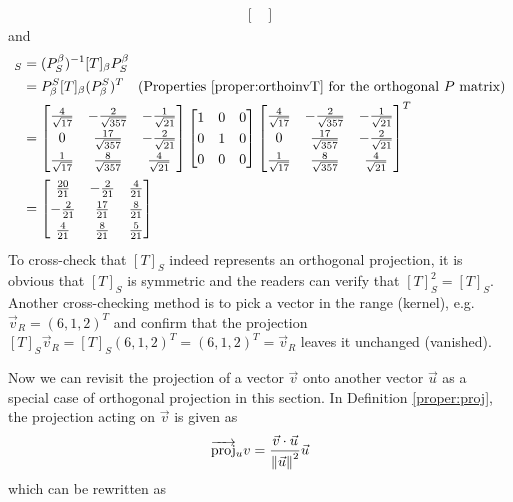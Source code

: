 \begin{solution}
\begin{align*}
\begin{bmatrix}
\end{bmatrix}
\end{align*}
and
\begin{align*}
[T]_S &= (P_S^\beta)^{-1} [T]_\beta P_S^\beta \\
&= P_\beta^S [T]_\beta (P_\beta^S)^T \text{\quad (Properties \ref{proper:orthoinvT} for the orthogonal $P$ matrix)} \\
&=
\renewcommand\arraystretch{1.25}
\begin{bmatrix}
\frac{4}{\sqrt{17}} & -\frac{2}{\sqrt{357}} & -\frac{1}{\sqrt{21}} \\
0 & \frac{17}{\sqrt{357}} & -\frac{2}{\sqrt{21}} \\
\frac{1}{\sqrt{17}} & \frac{8}{\sqrt{357}} & \frac{4}{\sqrt{21}}
\end{bmatrix}
\begin{bmatrix}
1 & 0 & 0 \\
0 & 1 & 0 \\
0 & 0 & 0
\end{bmatrix}
\begin{bmatrix}
\frac{4}{\sqrt{17}} & -\frac{2}{\sqrt{357}} & -\frac{1}{\sqrt{21}} \\
0 & \frac{17}{\sqrt{357}} & -\frac{2}{\sqrt{21}} \\
\frac{1}{\sqrt{17}} & \frac{8}{\sqrt{357}} & \frac{4}{\sqrt{21}}
\end{bmatrix}^T \\
&=
\renewcommand\arraystretch{1.25}
\begin{bmatrix}
\frac{20}{21}&-\frac{2}{21}&\frac{4}{21}\\ 
-\frac{2}{21}&\frac{17}{21}&\frac{8}{21}\\ 
\frac{4}{21}&\frac{8}{21}&\frac{5}{21}
\end{bmatrix}
\end{align*}
To cross-check that $[T]_S$ indeed represents an orthogonal projection, it is obvious that $[T]_S$ is symmetric and the readers can verify that $[T]_S^2 = [T]_S$. Another cross-checking method is to pick a vector in the range (kernel), e.g. $\vec{v}_R = (6,1,2)^T$ and confirm that the projection $[T]_S\vec{v}_R = [T]_S(6,1,2)^T = (6,1,2)^T = \vec{v}_R$ leaves it unchanged (vanished).
\end{solution}
Now we can revisit the projection of a vector $\vec{v}$ onto another vector $\vec{u}$ as a special case of orthogonal projection in this section. In Definition \ref{proper:proj}, the projection acting on $\vec{v}$ is given as \begin{align*}
\overrightarrow{\text{proj}}_u v = \frac{\vec{v} \cdot \vec{u}}{\norm{\vec{u}}^2} \vec{u}    
\end{align*} which can be rewritten as
